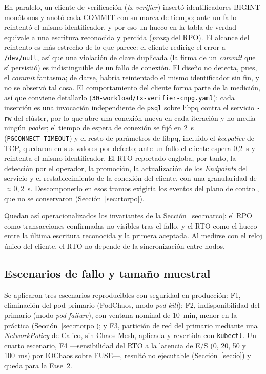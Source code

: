 \documentclass[12pt,twocolumn,letterpaper]{article}
\begin{document}
En paralelo, un cliente de verificación (\textit{tx-verifier}) insertó identificadores BIGINT monótonos y anotó cada COMMIT con su marca de tiempo; ante un fallo reintentó el mismo identificador, y por eso un hueco en la tabla de verdad equivale a una escritura reconocida y perdida (\textit{proxy} del RPO). El alcance del reintento es más estrecho de lo que parece: el cliente redirige el error a \texttt{/dev/null}, así que una violación de clave duplicada (la firma de un \textit{commit} que sí persistió) es indistinguible de un fallo de conexión. El diseño no detecta, pues, el \textit{commit} fantasma; de darse, habría reintentado el mismo identificador sin fin, y no se observó tal cosa. El comportamiento del cliente forma parte de la medición, así que conviene detallarlo (\texttt{30-workload/\allowbreak tx-verifier-cnpg.yaml}): cada inserción es una invocación independiente de \texttt{psql} sobre libpq contra el servicio \texttt{-rw} del clúster, por lo que abre una conexión nueva en cada iteración y no media ningún \textit{pooler}; el tiempo de espera de conexión se fijó en 2~s (\texttt{PGCONNECT\_TIMEOUT}) y el resto de parámetros de libpq, incluido el \textit{keepalive} de TCP, quedaron en sus valores por defecto; ante un fallo el cliente espera 0,2~s y reintenta el mismo identificador. El RTO reportado engloba, por tanto, la detección por el operador, la promoción, la actualización de los \textit{Endpoints} del servicio y el restablecimiento de la conexión del cliente, con una granularidad de $\approx 0{,}2$~s. Descomponerlo en esos tramos exigiría los eventos del plano de control, que no se conservaron (Sección~\ref{sec:rtorpo}).

Quedan así operacionalizados los invariantes de la Sección~\ref{sec:marco}: el RPO como transacciones confirmadas no visibles tras el fallo, y el RTO como el hueco entre la última escritura reconocida y la primera aceptada. Al medirse con el reloj único del cliente, el RTO no depende de la sincronización entre nodos.

\subsection{Escenarios de fallo y tamaño muestral}\label{sec:escenarios}
Se aplicaron tres escenarios reproducibles con seguridad en producción: F1, eliminación del pod primario (PodChaos, modo \textit{pod-kill}); F2, indisponibilidad del primario (modo \textit{pod-failure}), con ventana nominal de 10~min, menor en la práctica (Sección~\ref{sec:rtorpo}); y F3, partición de red del primario mediante una \textit{NetworkPolicy} de Calico, sin Chaos Mesh, aplicada y revertida con \texttt{kubectl}. Un cuarto escenario, F4 —sensibilidad del RTO a la latencia de E/S (0, 20, 50 y 100~ms) por IOChaos sobre FUSE—, resultó no ejecutable (Sección~\ref{sec:io}) y queda para la Fase~2.
\end{document}
